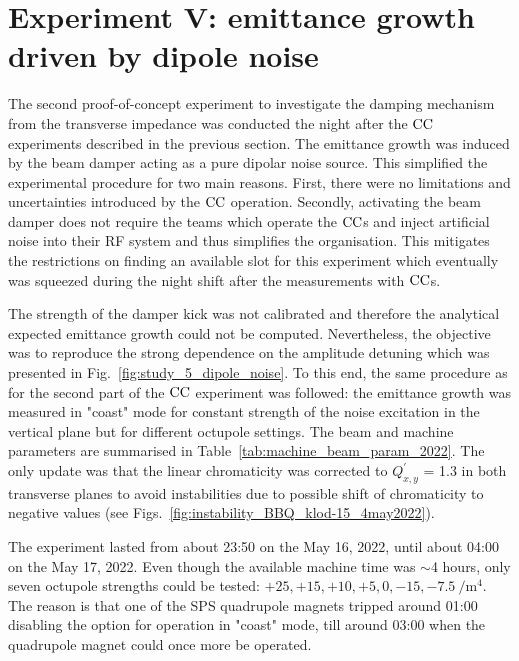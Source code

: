 \section{Experiment V: emittance growth driven by dipole noise}\label{sec:exp5_coast_md_damper_2022}
The second proof-of-concept experiment to investigate the damping mechanism from the transverse impedance was conducted the night after the ${\mathrm{CC}}$ experiments described in the previous section. The emittance growth was induced by the beam damper acting as a pure dipolar noise source. This simplified the experimental procedure for two main reasons. First, there were no limitations and uncertainties introduced by the ${\mathrm{CC}}$ operation. Secondly, activating the beam damper does not require the teams which operate the ${\mathrm{CC}}$s and inject artificial noise into their RF system and thus simplifies the organisation. This mitigates the restrictions on finding an available slot for this experiment which eventually was squeezed during the night shift after the measurements with ${\mathrm{CC}}$s. %

The strength of the damper kick was not calibrated and therefore the analytical expected emittance growth could not be computed. Nevertheless, the objective was to reproduce the strong dependence on the amplitude detuning which was presented in Fig.~\ref{fig:study_5_dipole_noise}. To this end, the same procedure as for the second part of the ${\mathrm{CC}}$ experiment was followed: the emittance growth was measured in "coast" mode for constant strength of the noise excitation in the vertical plane but for different octupole settings. The beam and machine parameters are summarised in Table~\ref{tab:machine_beam_param_2022}. The only update was that the linear chromaticity was corrected to $Q^\prime_{x,y}$ = 1.3 in both transverse planes to avoid instabilities due to possible shift of chromaticity to negative values (see Figs.~\ref{fig:instability_BBQ_klod-15_4may2022}).%

The experiment lasted from about 23:50 on the May 16, 2022, until about 04:00 on the May 17, 2022. Even though the available machine time was $\sim$4 hours, only seven octupole strengths could be tested: $+25, +15, +10, +5, 0, -15, -7.5 \ \mathrm{/m^4}$. The reason is that one of the SPS quadrupole magnets tripped around 01:00 disabling the option for operation in "coast" mode, till around 03:00 when the quadrupole magnet could once more be operated.

